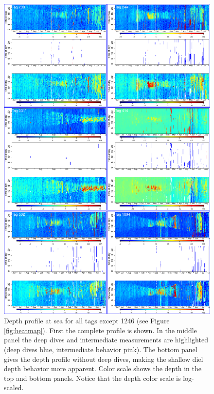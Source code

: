\begin{figure}[ht]
  \centering
  \includegraphics[width=.85\linewidth]{figS1}    
  \caption{Depth profile at sea for all tags except 1246 (see Figure \ref{fig:heatmap}). First the complete profile is shown. In the middle panel the deep dives and intermediate measurements are highlighted (deep dives blue, intermediate behavior pink). 
    The bottom panel gives the depth profile without deep dives, making the shallow diel depth behavior more apparent. 
    Color scale shows the depth in the top and bottom panels. Notice that the depth color scale is log-scaled.}
\label{fig:alldep}
\end{figure}




